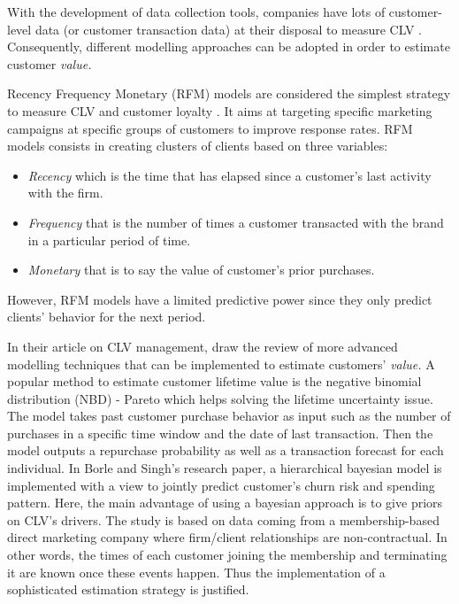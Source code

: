 \documentclass[
]{book}
\providecommand{\tightlist}{%
  \setlength{\itemsep}{0pt}\setlength{\parskip}{0pt}}
\begin{document}
With the development of data collection tools, companies have lots of customer-level data (or customer transaction data) at their disposal to measure CLV \citep{CLV_NBD}. Consequently, different modelling approaches can be adopted in order to estimate customer \emph{value.}

Recency Frequency Monetary (RFM) models are considered the simplest strategy to measure CLV and customer loyalty \citep{CLV}. It aims at targeting specific marketing campaigns at specific groups of customers to improve response rates. RFM models consists in creating clusters of clients based on three variables:

\begin{itemize}
\tightlist
\item
  \emph{Recency} which is the time that has elapsed since a customer's last activity with the firm.
\item
  \emph{Frequency} that is the number of times a customer transacted with the brand in a particular period of time.
\item
  \emph{Monetary} that is to say the value of customer's prior purchases.
\end{itemize}

However, RFM models have a limited predictive power since they only predict clients' behavior for the next period.

In their article on CLV management, \citet{CLV_MEASUREMENT} draw the review of more advanced modelling techniques that can be implemented to estimate customers' \emph{value.} A popular method to estimate customer lifetime value is the negative binomial distribution (NBD) - Pareto \citep{CLV_NBD} which helps solving the lifetime uncertainty issue. The model takes past customer purchase behavior as input such as the number of purchases in a specific time window and the date of last transaction. Then the model outputs a repurchase probability as well as a transaction forecast for each individual. In Borle and Singh's research paper, a hierarchical bayesian model is implemented with a view to jointly predict customer's churn risk and spending pattern. Here, the main advantage of using a bayesian approach is to give priors on CLV's drivers. The study is based on data coming from a membership-based direct marketing company where firm/client relationships are non-contractual. In other words, the times of each customer joining the membership and terminating it are known once these events happen. Thus the implementation of a sophisticated estimation strategy is justified.
\end{document}
